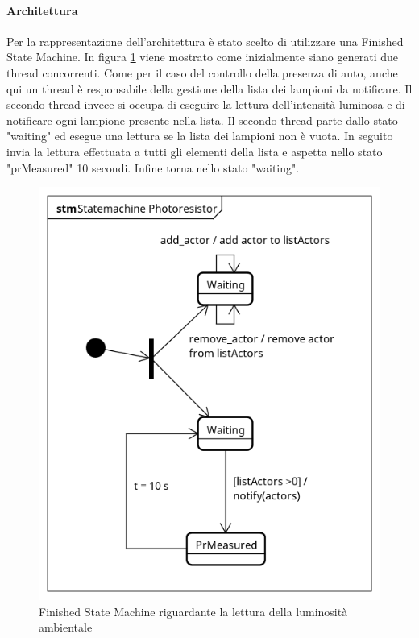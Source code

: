 \paragraph{Architettura}
Per la rappresentazione dell'architettura è stato scelto di utilizzare una Finished State Machine.
In figura \ref{FSM PR} viene mostrato come inizialmente siano generati due thread concorrenti. Come per il caso del controllo della presenza di auto, anche qui un thread è responsabile della gestione della lista dei lampioni da notificare. Il secondo thread invece si occupa di eseguire la lettura dell'intensità luminosa e di notificare ogni lampione presente nella lista.
Il secondo thread parte dallo stato "waiting" ed esegue una lettura se la lista dei lampioni non è vuota. In seguito invia la lettura effettuata a tutti gli elementi della lista e aspetta nello stato "prMeasured" 10 secondi. Infine torna nello stato "waiting".
\begin{figure}[tbp]
	\centering
	\includegraphics[scale=.8]{figure/Statemachine_Photoresistor.png}
	\caption{Finished State Machine riguardante la lettura della luminosità ambientale \label{FSM PR}}
\end{figure}

